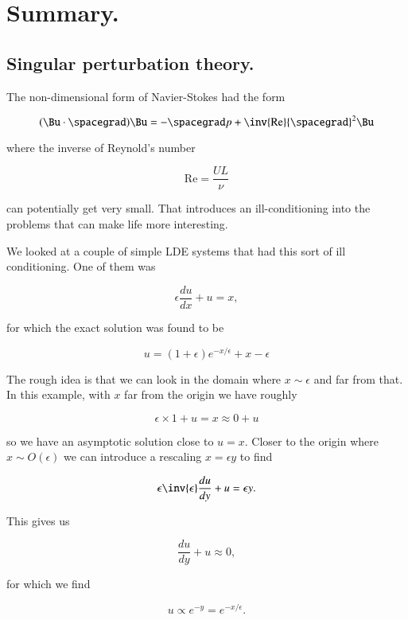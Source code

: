 \section{Summary.}
\subsection{Singular perturbation theory.}

The non-dimensional form of Navier-Stokes had the form

\begin{equation}\label{eqn:continuumFluidsReview:2670}
(\Bu \cdot \spacegrad) \Bu = -\spacegrad p + \inv{\text{Re}} {\spacegrad}^2 \Bu
\end{equation}

where the inverse of Reynold's number

\begin{equation}\label{eqn:continuumFluidsReview:2610}
\text{Re} = \frac{U L}{\nu}
\end{equation}

can potentially get very small.  That introduces an ill-conditioning into the problems that can make life more interesting.

We looked at a couple of simple LDE systems that had this sort of ill conditioning.  One of them was

\begin{equation}\label{eqn:continuumFluidsReview:2630}
\epsilon \frac{du}{dx} + u = x,
\end{equation}

for which the exact solution was found to be

\begin{equation}\label{eqn:continuumFluidsReview:2650}
u = (1 + \epsilon) e^{-x/\epsilon} + x - \epsilon
\end{equation}

The rough idea is that we can look in the domain where $x \sim \epsilon$ and far from that.  In this example, with $x$ far from the origin we have roughly

\begin{equation}\label{eqn:continuumFluidsReview:2690}
\epsilon \times 1 + u = x \approx 0 + u
\end{equation}

so we have an asymptotic solution close to $u = x$.  Closer to the origin where $x \sim O(\epsilon)$ we can introduce a rescaling $x = \epsilon y$ to find

\begin{equation}\label{eqn:continuumFluidsReview:2710}
\epsilon \inv{\epsilon} \frac{du}{dy} + u = \epsilon y.
\end{equation}

This gives us

\begin{equation}\label{eqn:continuumFluidsReview:2730}
\frac{du}{dy} + u \approx 0,
\end{equation}

for which we find 

\begin{equation}\label{eqn:continuumFluidsReview:2750}
u \propto e^{-y} = e^{-x/\epsilon}.
\end{equation}

